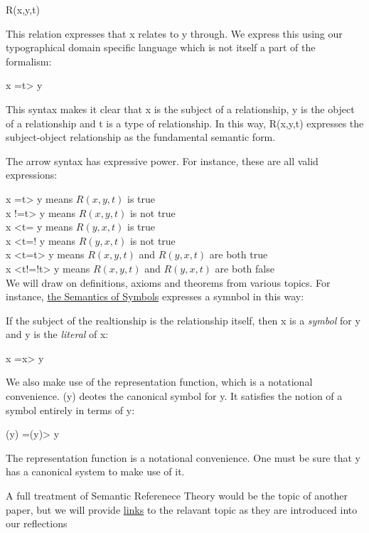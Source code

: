 \documentclass[runningheads]{llncs}
\begin{document}
R(x,y,t)

This relation expresses that x relates to y through. We express this using our typographical domain specific language which is not itself a part of the formalism:

x =t> y

This syntax makes it clear that x is the subject of a relationship, y is the object of a relationship and t is a type of relationship. In this way, R(x,y,t) expresses the subject-object relationship as the fundamental semantic form.  

The arrow syntax has expressive power. For instance, these are all valid expressions:

x =t> y means $R(x,y,t)$ is true \\
x !=t> y means $R(x,y,t)$ is not true \\
x <t= y means $R(y,x,t)$ is true \\
x <t=! y means $R(y,x,t)$ is not true \\
x <t=t> y means $R(x,y,t)$ and $R(y,x,t)$ are both true \\
x <t!=!t> y means $R(x,y,t)$ and $R(y,x,t)$ are both false \\

We will draw on definitions, axioms and theorems from various topics. For instance, \href{https://github.com/DNA-Platform/inexplicable-phenomena/formalism/semantic-reference-theory/symbols.pdf}{the Semantics of Symbols} expresses a symnbol in this way:

If the subject of the realtionship is the relationship itself, then x is a \emph{symbol} for y and y is the \emph{literal} of x:

x =x> y

We also make use of the representation function, which is a notational convenience. (y) deotes the canonical symbol for y. It satisfies the notion of a symbol entirely in terms of y:

(y) =(y)> y

The representation function is a notational convenience. One must be sure that y has a canonical system to make use of it.

A full treatment of Semantic Referenece Theory would be the topic of another paper, but we will provide \href{https://github.com/DNA-Platform/inexplicable-phenomena/formalism/semantic-reference-theory/introduction.pdf}{links} to the relavant topic as they are introduced into our reflections


\end{document}
